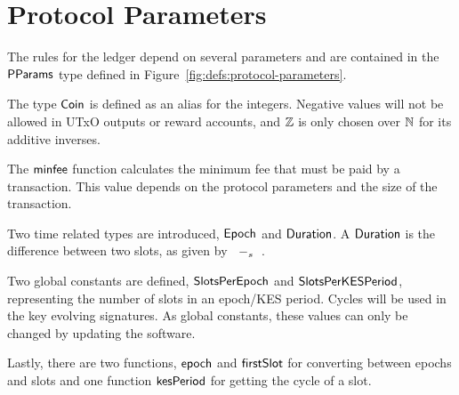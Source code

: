 \section{Protocol Parameters}
\label{sec:protocol-parameters}

The rules for the ledger depend on several parameters and are contained in the $\mathsf{PParams}$ type
defined in Figure~\ref{fig:defs:protocol-parameters}.

The type $\mathsf{Coin}$ is defined as an alias for the integers.
Negative values will not be allowed in UTxO outputs or reward accounts,
and $\mathbb{Z}$ is only chosen over $\mathbb{N}$ for its additive inverses.

The $\mathsf{minfee}$ function calculates the minimum fee that must be paid by a transaction.
This value depends on the protocol parameters and the size of the transaction.

Two time related types are introduced, $\mathsf{Epoch}$ and $\mathsf{Duration}$.
A $\mathsf{Duration}$ is the difference between two slots, as given by $\mathit{}~-_{s}~\mathit{}$.

Two global constants are defined, $\mathsf{SlotsPerEpoch}$ and $\mathsf{SlotsPerKESPeriod}$,
representing the number of slots in an epoch/KES period.  Cycles will be used in
the key evolving signatures.  As global constants, these values can only be
changed by updating the software.

Lastly, there are two functions, $\mathsf{epoch}$ and $\mathsf{firstSlot}$ for converting
between epochs and slots and one function $\mathsf{kesPeriod}$ for getting the cycle of a slot.

